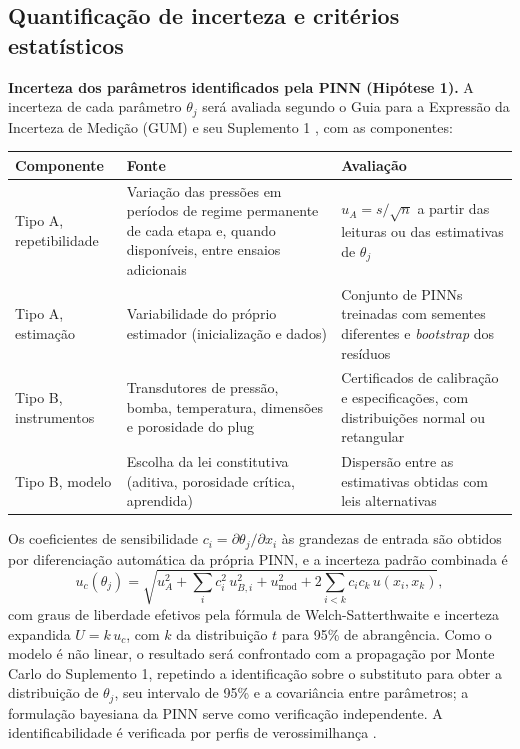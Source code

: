 \documentclass[10pt,a4paper]{article}
\begin{document}
\subsection{Quantificação de incerteza e critérios estatísticos}\label{sec:incerteza}

\textbf{Incerteza dos parâmetros identificados pela PINN (Hipótese 1).} A incerteza de cada
parâmetro $\theta_j$ será avaliada segundo o Guia para a Expressão da Incerteza de Medição
(GUM) \cite{gum2008} e seu Suplemento 1 \cite{gums12008}, com as componentes:

\begin{center}
\small
\begin{tabularx}{\textwidth}{@{}l>{\raggedright\arraybackslash}X>{\raggedright\arraybackslash}X@{}}
\toprule
\textbf{Componente} & \textbf{Fonte} & \textbf{Avaliação} \\
\midrule
Tipo A, repetibilidade & Variação das pressões em períodos de regime permanente de cada etapa e, quando disponíveis, entre ensaios adicionais & $u_A = s/\sqrt{n}$ a partir das leituras ou das estimativas de $\theta_j$ \\
Tipo A, estimação & Variabilidade do próprio estimador (inicialização e dados) & Conjunto de PINNs treinadas com sementes diferentes \cite{lakshminarayanan2017} e \textit{bootstrap} dos resíduos \cite{efron1993} \\
Tipo B, instrumentos & Transdutores de pressão, bomba, temperatura, dimensões e porosidade do plug & Certificados de calibração e especificações, com distribuições normal ou retangular \\
Tipo B, modelo & Escolha da lei constitutiva (aditiva, porosidade crítica, aprendida) & Dispersão entre as estimativas obtidas com leis alternativas \\
\bottomrule
\end{tabularx}
\end{center}

\noindent Os coeficientes de sensibilidade $c_i = \partial\theta_j/\partial x_i$ às grandezas de
entrada são obtidos por diferenciação automática da própria PINN, e a incerteza padrão
combinada é
\begin{equation}
u_c(\theta_j) = \sqrt{u_{A}^{2} + \sum_i c_i^{2}\,u_{B,i}^{2} + u_{\mathrm{mod}}^{2} + 2\sum_{i<k} c_i c_k\, u(x_i,x_k)},
\end{equation}
com graus de liberdade efetivos pela fórmula de Welch-Satterthwaite e incerteza expandida
$U = k\,u_c$, com $k$ da distribuição $t$ para 95\% de abrangência. Como o modelo é não
linear, o resultado será confrontado com a propagação por Monte Carlo do Suplemento 1,
repetindo a identificação sobre o substituto para obter a distribuição de $\theta_j$, seu
intervalo de 95\% e a covariância entre parâmetros; a formulação bayesiana da PINN
\cite{yang2021bpinn} serve como verificação independente. A identificabilidade é verificada por perfis de
verossimilhança \cite{raue2009}.
\end{document}
